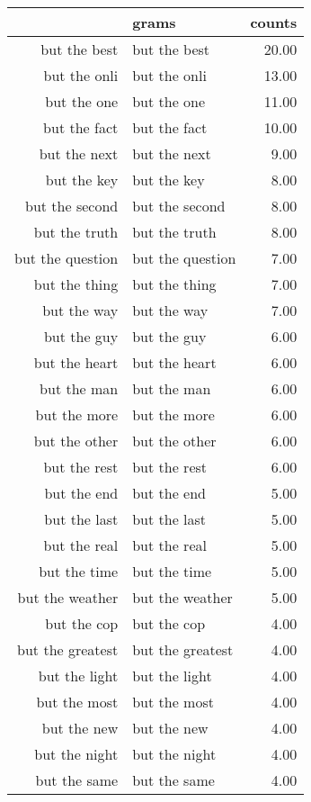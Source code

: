 \begin{table}[ht]
\centering
\begin{tabular}{rlr}
  \hline
 & grams & counts \\ 
  \hline
but the best & but the best & 20.00 \\ 
  but the onli & but the onli & 13.00 \\ 
  but the one & but the one & 11.00 \\ 
  but the fact & but the fact & 10.00 \\ 
  but the next & but the next & 9.00 \\ 
  but the key & but the key & 8.00 \\ 
  but the second & but the second & 8.00 \\ 
  but the truth & but the truth & 8.00 \\ 
  but the question & but the question & 7.00 \\ 
  but the thing & but the thing & 7.00 \\ 
  but the way & but the way & 7.00 \\ 
  but the guy & but the guy & 6.00 \\ 
  but the heart & but the heart & 6.00 \\ 
  but the man & but the man & 6.00 \\ 
  but the more & but the more & 6.00 \\ 
  but the other & but the other & 6.00 \\ 
  but the rest & but the rest & 6.00 \\ 
  but the end & but the end & 5.00 \\ 
  but the last & but the last & 5.00 \\ 
  but the real & but the real & 5.00 \\ 
  but the time & but the time & 5.00 \\ 
  but the weather & but the weather & 5.00 \\ 
  but the cop & but the cop & 4.00 \\ 
  but the greatest & but the greatest & 4.00 \\ 
  but the light & but the light & 4.00 \\ 
  but the most & but the most & 4.00 \\ 
  but the new & but the new & 4.00 \\ 
  but the night & but the night & 4.00 \\ 
  but the same & but the same & 4.00 \\ 

\end{tabular}
\end{table}
